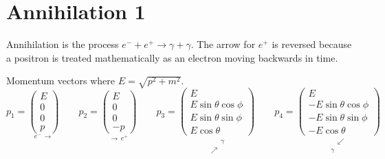 

\section*{Annihilation 1}

Annihilation is the process $e^-+e^+\rightarrow\gamma+\gamma$.
The arrow for $e^+$ is reversed because a positron is treated
mathematically as an electron moving backwards in time.

\begin{center}
\end{center}

Momentum vectors where $E=\sqrt{p^2+m^2}$.
\begin{equation*}
p_1=\underset{e^- \, \longrightarrow}
{\begin{pmatrix}E\\0\\0\\p\end{pmatrix}}
\qquad
p_2=\underset{\longrightarrow \, e^+}
{\begin{pmatrix}E\\0\\0\\-p\end{pmatrix}}
\qquad
p_3=\underset{\substack{\phantom{\nearrow} \, \gamma\\\nearrow \, \phantom{\gamma}}}
{\begin{pmatrix}E\\ E\sin\theta\cos\phi\\ E\sin\theta\sin\phi\\ E\cos\theta\end{pmatrix}}
\qquad
p_4=\underset{\substack{\phantom{\gamma} \, \swarrow\\\gamma \, \phantom{\swarrow}}}
{\begin{pmatrix}E\\ -E\sin\theta\cos\phi\\ -E\sin\theta\sin\phi\\ -E\cos\theta\end{pmatrix}}
\end{equation*}

